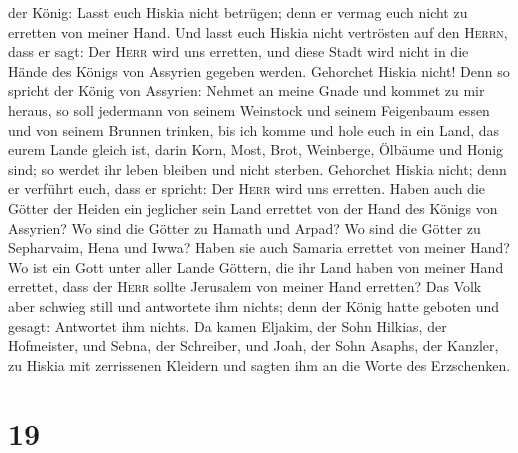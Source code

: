 der König: Lasst euch Hiskia nicht betrügen; denn er vermag euch nicht
zu erretten von meiner Hand.  Und lasst euch Hiskia nicht
vertrösten auf den \textsc{Herrn}, dass er sagt: Der \textsc{Herr} wird
uns erretten, und diese Stadt wird nicht in die Hände des Königs von
Assyrien gegeben werden.  Gehorchet Hiskia nicht! Denn so
spricht der König von Assyrien: Nehmet an meine Gnade und kommet zu mir
heraus, so soll jedermann von seinem Weinstock und seinem Feigenbaum
essen und von seinem Brunnen trinken,  bis ich komme und
hole euch in ein Land, das eurem Lande gleich ist, darin Korn, Most,
Brot, Weinberge, Ölbäume und Honig sind; so werdet ihr leben bleiben und
nicht sterben. Gehorchet Hiskia nicht; denn er verführt euch, dass er
spricht: Der \textsc{Herr} wird uns erretten.  Haben auch
die Götter der Heiden ein jeglicher sein Land errettet von der Hand des
Königs von Assyrien?  Wo sind die Götter zu Hamath und
Arpad? Wo sind die Götter zu Sepharvaim, Hena und Iwwa? Haben sie auch
Samaria errettet von meiner Hand?  Wo ist ein Gott unter
aller Lande Göttern, die ihr Land haben von meiner Hand errettet, dass
der \textsc{Herr} sollte Jerusalem von meiner Hand erretten?
 Das Volk aber schwieg still und antwortete ihm nichts;
denn der König hatte geboten und gesagt: Antwortet ihm nichts.
 Da kamen Eljakim, der Sohn Hilkias, der Hofmeister, und
Sebna, der Schreiber, und Joah, der Sohn Asaphs, der Kanzler, zu Hiskia
mit zerrissenen Kleidern und sagten ihm an die Worte des Erzschenken.

\hypertarget{section-18}{%
\section{19}\label{section-18}}

